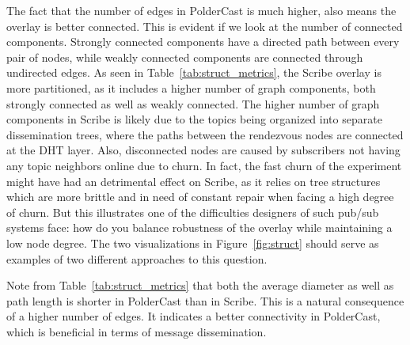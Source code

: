 The fact that the number of edges in PolderCast is much higher, also
means the overlay is better connected. This is evident if we look at the
number of connected components. Strongly connected components have a
directed path between every pair of nodes, while weakly connected
components are connected through undirected edges. As seen in
Table~\ref{tab:struct_metrics}, the Scribe overlay is more partitioned,
as it includes a higher number of graph components, both strongly
connected as well as weakly connected. The higher number of graph
components in Scribe is likely due to the topics being organized into
separate dissemination trees, where the paths between the rendezvous
nodes are connected at the DHT layer. Also, disconnected nodes are
caused by subscribers not having any topic neighbors online due to
churn. In fact, the fast churn of the experiment might have had an
detrimental effect on Scribe, as it relies on tree structures which are more
brittle and in need of constant repair when facing a high degree of
churn. But this illustrates one of the difficulties designers of such
pub/sub systems face: how do you balance robustness of the overlay while
maintaining a low node degree. The two visualizations in
Figure~\ref{fig:struct} should serve as examples of two different
approaches to this question.

Note from Table~\ref{tab:struct_metrics} that both the average diameter
as well as path length is shorter in PolderCast than in Scribe. This is
a natural consequence of a higher number of edges. It indicates a better
connectivity in PolderCast, which is beneficial in terms of message
dissemination.

